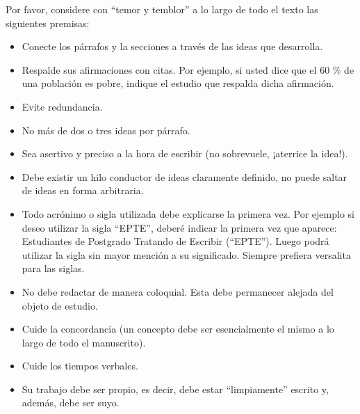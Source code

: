 Por favor, considere con ``temor y temblor'' a lo largo de todo el texto las siguientes premisas:
\begin{itemize}
	\item Conecte los párrafos y la secciones a través de las ideas que desarrolla.
	\item Respalde sus afirmaciones con citas. Por ejemplo, si usted dice que el 60 \% de una población es pobre, indique el estudio que respalda dicha afirmación.
	\item Evite redundancia.
	\item No más de dos o tres ideas por párrafo.
	\item Sea asertivo y preciso a la hora de escribir (no sobrevuele, ¡aterrice la idea!).
	\item Debe existir un hilo conductor de ideas claramente definido, no puede saltar de ideas en forma arbitraria.
	\item Todo acrónimo o sigla utilizada debe explicarse la primera vez. Por ejemplo si deseo utilizar la sigla \textsc{``EPTE''}, deberé indicar la primera vez que aparece: Estudiantes de Postgrado Tratando de Escribir (\textsc{``EPTE''}). Luego podrá utilizar la sigla sin mayor mención a su significado. Siempre prefiera versalita para las siglas.
	\item No debe redactar de manera coloquial. Esta debe permanecer alejada del objeto de estudio.
	\item Cuide la concordancia (un concepto debe ser esencialmente el mismo a lo largo de todo el manuscrito).
	\item Cuide los tiempos verbales.
	\item Su trabajo debe ser propio, es decir, debe estar ``limpiamente'' escrito y, además, debe ser suyo. 
\end{itemize}

